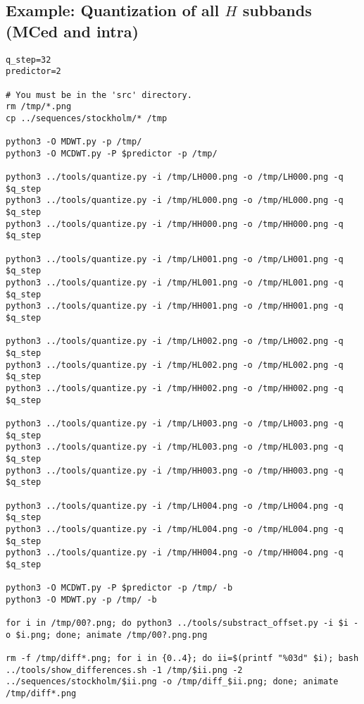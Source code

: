 \subsection*{Example: Quantization of all $H$ subbands (MCed and intra)}
\begin{verbatim}
q_step=32
predictor=2

# You must be in the 'src' directory.
rm /tmp/*.png
cp ../sequences/stockholm/* /tmp

python3 -O MDWT.py -p /tmp/
python3 -O MCDWT.py -P $predictor -p /tmp/

python3 ../tools/quantize.py -i /tmp/LH000.png -o /tmp/LH000.png -q $q_step
python3 ../tools/quantize.py -i /tmp/HL000.png -o /tmp/HL000.png -q $q_step
python3 ../tools/quantize.py -i /tmp/HH000.png -o /tmp/HH000.png -q $q_step

python3 ../tools/quantize.py -i /tmp/LH001.png -o /tmp/LH001.png -q $q_step
python3 ../tools/quantize.py -i /tmp/HL001.png -o /tmp/HL001.png -q $q_step
python3 ../tools/quantize.py -i /tmp/HH001.png -o /tmp/HH001.png -q $q_step

python3 ../tools/quantize.py -i /tmp/LH002.png -o /tmp/LH002.png -q $q_step
python3 ../tools/quantize.py -i /tmp/HL002.png -o /tmp/HL002.png -q $q_step
python3 ../tools/quantize.py -i /tmp/HH002.png -o /tmp/HH002.png -q $q_step

python3 ../tools/quantize.py -i /tmp/LH003.png -o /tmp/LH003.png -q $q_step
python3 ../tools/quantize.py -i /tmp/HL003.png -o /tmp/HL003.png -q $q_step
python3 ../tools/quantize.py -i /tmp/HH003.png -o /tmp/HH003.png -q $q_step

python3 ../tools/quantize.py -i /tmp/LH004.png -o /tmp/LH004.png -q $q_step
python3 ../tools/quantize.py -i /tmp/HL004.png -o /tmp/HL004.png -q $q_step
python3 ../tools/quantize.py -i /tmp/HH004.png -o /tmp/HH004.png -q $q_step

python3 -O MCDWT.py -P $predictor -p /tmp/ -b
python3 -O MDWT.py -p /tmp/ -b

for i in /tmp/00?.png; do python3 ../tools/substract_offset.py -i $i -o $i.png; done; animate /tmp/00?.png.png

rm -f /tmp/diff*.png; for i in {0..4}; do ii=$(printf "%03d" $i); bash ../tools/show_differences.sh -1 /tmp/$ii.png -2 ../sequences/stockholm/$ii.png -o /tmp/diff_$ii.png; done; animate /tmp/diff*.png
\end{verbatim}

